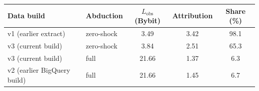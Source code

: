 \documentclass[referee,pdflatex,sn-mathphys-ay]{sn-jnl}
\newcommand{\fitbox}{\ifdim\wd\tabbox>\linewidth\resizebox{\linewidth}{!}{\usebox{\tabbox}}\else\usebox{\tabbox}\fi}%
\theoremstyle{thmstyleone}%
\theoremstyle{thmstyletwo}%
\theoremstyle{thmstylethree}%
\begin{document}
\begin{lrbox}{\tabbox}\footnotesize\setlength{\tabcolsep}{3pt}%
\begin{tabular}{@{}llccc@{}}
\toprule
\textbf{Data build} & \textbf{Abduction} & \textbf{$L_{\mathrm{obs}}$(Bybit)} & \textbf{Attribution} & \textbf{Share (\%)}\\
\midrule
v1 (earlier extract) & zero-shock & 3.49 & 3.42 & 98.1 \\
v3 (current build) & zero-shock & 3.84 & 2.51 & 65.3 \\
v3 (current build) & full & 21.66 & 1.37 & 6.3 \\
v2 (earlier BigQuery build) & full & 21.66 & 1.45 & 6.7 \\
\bottomrule
\end{tabular}
\end{lrbox}
\begin{tableorg}[tbp]
\centering
\caption{Abduction lesson for Binance$\to$Bybit. Attribution is the drop in Bybit's loss; the share is attribution
divided by $L_{\mathrm{obs}}$, which is the realised hinge loss under full abduction and the model-implied loss under zero-shock abduction.}
\label{tab:abduction}
\fitbox
\end{tableorg}
\end{document}
